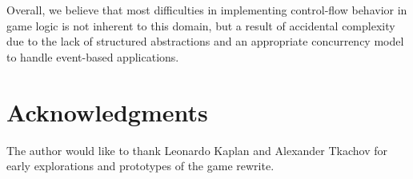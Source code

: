 \documentclass{vgtc}                          %
\begin{document}
Overall, we believe that most difficulties in implementing control-flow
behavior in game logic is not inherent to this domain, but a result of
accidental complexity due to the lack of structured abstractions and an
appropriate concurrency model to handle event-based applications.

\section{Acknowledgments}

The author would like to thank Leonardo Kaplan and Alexander Tkachov for early
explorations and prototypes of the game rewrite.



\end{document}
